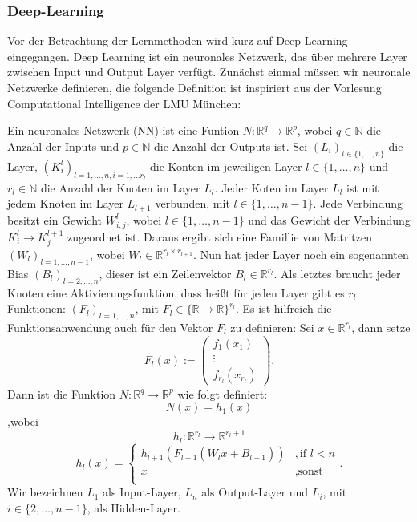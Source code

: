 \documentclass[12pt,letterpaper,ngerman]{article}
\begin{document}
\subsubsection{Deep-Learning}
Vor der Betrachtung der Lernmethoden wird kurz auf Deep Learning eingegangen.
Deep Learning ist ein neuronales Netzwerk, das über mehrere Layer zwischen
Input und Output Layer verfügt. 
Zunächst einmal müssen wir neuronale Netzwerke definieren, die folgende
Definition ist inspiriert aus der Vorlesung Computational Intelligence
der LMU München:
\begin{definition}
  Ein neuronales Netzwerk (NN) ist eine Funtion $N: \mathbb{R}^q \to \mathbb{R}^p$,
  wobei $q\in \mathbb{N}$ die Anzahl der Inputs und $p \in \mathbb{N}$ die
  Anzahl der Outputs ist. Sei $(L_i)_{i \in \{ 1, \dots, n\}}$ die Layer,
  $(K_i^l)_{l=1,\dots, n, i = 1,\dots r_l}$ die Konten im jeweiligen Layer 
  $l \in \{1, \dots, n\}$ und $r_l \in \mathbb{N}$ die Anzahl der Knoten im
  Layer $L_l$. Jeder Koten im Layer $L_l$ ist mit jedem Knoten im 
  Layer $L_{l+1}$ verbunden, mit $l \in \{1,\dots, n-1\}$. Jede Verbindung
  besitzt ein Gewicht $W_{i,j}^l$, wobei $l \in \{1,\dots, n-1\}$ und 
  das Gewicht der Verbindung $K^l_i \to K^{l+1}_j$ zugeordnet ist.
  Daraus ergibt sich eine Famillie von Matritzen 
  $(W_l)_{l=1,\dots, n-1}$, wobei $ W_l\in \mathbb{R}^{r_l\times r_{l+1}}$.
  Nun hat jeder Layer noch ein sogenannten Bias $(B_l)_{l = 2,\dots,n}$,
  dieser ist ein Zeilenvektor $B_l \in \mathbb{R}^{r_l}$.
  Als letztes braucht jeder Knoten eine Aktivierungsfunktion, dass heißt
  für jeden Layer gibt es $r_l$ Funktionen:
  $(F_l)_{l=1,\dots,n}$, mit $F_l \in \{\mathbb{R} \to \mathbb{R}\}^{r_l}$.
  Es ist hilfreich die Funktionsanwendung auch für den Vektor $F_l$ zu definieren:
  Sei $x \in \mathbb{R}^{r_l}$, dann setze
  \[
    F_l(x) := \begin{pmatrix} 
        f_1(x_1) \\
        \vdots\\
        f_{r_l}(x_{r_l})
    \end{pmatrix}.
  \]
  Dann ist die Funktion $N: \mathbb{R}^q \to \mathbb{R}^p$ wie folgt definiert:
  \[
    N(x) = h_1(x)
  \]
  ,wobei
  \[h_l: \mathbb{R}^{r_l} \to \mathbb{R}^{r_l+1}\]
  \[
    h_l(x) = 
      \begin{cases}
        h_{l+1}(F_{l+1}(W_lx + B_{l+1}))& ,  \text{if } l < n \\ 
        x & , \text{sonst}\\
      \end{cases}.
  \]
  Wir bezeichnen $L_1$ als Input-Layer, $L_n$ als Output-Layer und
  $L_i$, mit $i \in \{2, \dots, n-1\}$, als Hidden-Layer.
\end{definition}
\end{document}
